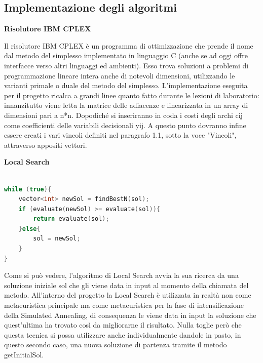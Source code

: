 \documentclass[preprint,12pt]{elsarticle}
\begin{document}
\subsection{\textbf{Implementazione degli algoritmi}\\}

\begin{large}
\textbf{Risolutore IBM CPLEX}
\end{large}


Il risolutore IBM CPLEX è un programma di ottimizzazione che prende il nome dal metodo del simplesso implementato in linguaggio C (anche se ad oggi offre interfacce verso altri linguaggi ed ambienti). Esso trova soluzioni a problemi di programmazione lineare intera anche di notevoli dimensioni, utilizzando le varianti primale o duale del metodo del simplesso. L'implementazione eseguita per il progetto ricalca a grandi linee quanto fatto durante le lezioni di laboratorio: innanzitutto viene letta la matrice delle adiacenze e linearizzata in un array di dimensioni pari a n*n. Dopodiché si inseriranno in coda i costi degli archi c{\tiny ij} come coefficienti delle variabili decisionali y{\tiny ij}. A questo punto dovranno infine essere creati i vari vincoli definiti nel paragrafo 1.1, sotto la voce "Vincoli", attraverso appositi vettori. \\



\begin{large}
\textbf{Local Search}
\end{large}

\begin{lstlisting}[basicstyle=\small, caption={Local Search}, frame=single, language=C++]

while (true){
	vector<int> newSol = findBestN(sol);
	if (evaluate(newSol) >= evaluate(sol)){	
		return evaluate(sol);
	}else{					
		sol = newSol;
	}
}


\end{lstlisting}


Come si può vedere, l'algoritmo di Local Search avvia la sua ricerca da una soluzione iniziale sol che gli viene data in input al momento della chiamata del metodo. All'interno del progetto la Local Search è utilizzata in realtà non come metaeuristica principale ma come metaeuristica per la fase di intensificazione della Simulated Annealing, di consequenza le viene data in input la soluzione che quest'ultima ha trovato così da migliorarne il risultato. Nulla toglie però che questa tecnica si possa utilizzare anche individualmente dandole in pasto, in questo secondo caso, una nuova soluzione di partenza tramite il metodo getInitialSol. 
\end{document}
